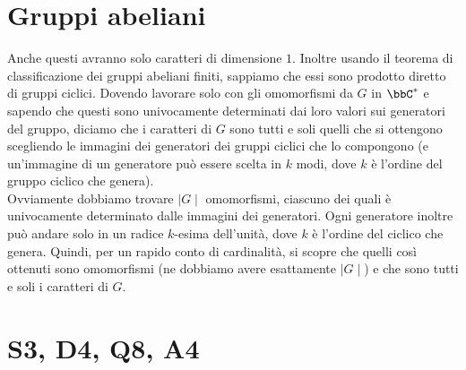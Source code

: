 \documentclass[a4paper,NoNotes,GeneralMath]{stdmdoc}
\begin{document}
	\section*{Gruppi abeliani}
	Anche questi avranno solo caratteri di dimensione $1$. Inoltre usando il teorema di classificazione dei gruppi abeliani finiti, sappiamo che essi sono prodotto diretto di gruppi ciclici. Dovendo lavorare solo con gli omomorfismi da $G$ in $\bbC^{*}$ e sapendo che questi sono univocamente determinati dai loro valori sui generatori del gruppo, diciamo che i caratteri di $G$ sono tutti e soli quelli che si ottengono scegliendo le immagini dei generatori dei gruppi ciclici che lo compongono (e un'immagine di un generatore può essere scelta in $k$ modi, dove $k$ è l'ordine del gruppo ciclico che genera). \\
	Ovviamente dobbiamo trovare $\mid G \mid$ omomorfismi, ciascuno dei quali è univocamente determinato dalle immagini dei generatori. Ogni generatore inoltre può andare solo in un radice $k$-esima dell'unità, dove $k$ è l'ordine del ciclico che genera. Quindi, per un rapido conto di cardinalità, si scopre che quelli così ottenuti sono omomorfismi (ne dobbiamo avere esattamente $\mid G \mid$) e che sono tutti e soli i caratteri di $G$.

	\section*{S3, D4, Q8, A4}
\end{document}
